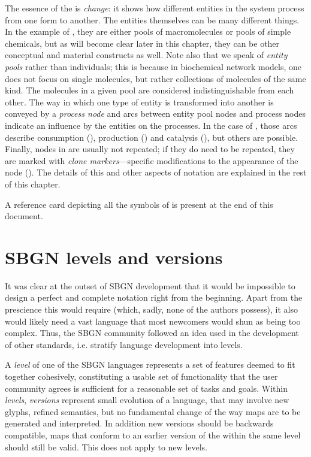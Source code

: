 The essence of the \PDs is \emph{change}: it shows how different entities in the system process from one form to another.  The entities themselves can be many different things.  In the example of , they are either pools of macromolecules or pools of simple chemicals, but as will become clear later in this chapter, they can be other conceptual and material constructs as well.  Note also that we speak of \emph{entity pools} rather than individuals; this is because in biochemical network models, one does not focus on single molecules, but rather collections of molecules of the same kind.  The molecules in a given pool are considered indistinguishable from each other.  The way in which one type of entity is transformed into another is conveyed by a \emph{process node} and arcs between entity pool nodes and process nodes indicate an influence by the entities on the processes.  In the case of , those arcs describe consumption (), production () and catalysis 
(), but others are possible.  Finally, nodes in \PDs are usually not repeated; if they do need to be repeated, they are marked with \emph{clone markers}---specific modifications to the appearance of the node (). The details of this and other aspects of \PD notation are explained in the rest of this chapter.

A reference card depicting all the symbols of \SBGNPDLone is present at the end of this document.

\section{SBGN levels and versions}
\label{sec:sbgn-levels}

It was clear at the outset of SBGN development that it would be impossible to design a perfect and complete notation right from the beginning.  Apart from the prescience this would require (which, sadly, none of the authors possess), it also would likely need a vast language that most newcomers would shun as being too complex.  Thus, the SBGN community followed an idea used in the development of other standards, i.e. stratify language development into levels.

A \emph{level} of one of the SBGN languages represents a set of features deemed to fit together cohesively, constituting a usable set of functionality that the user community agrees is sufficient for a reasonable set of tasks and goals.  Within \emph{levels}, \emph{versions} represent small evolution of a language, that may involve new glyphs, refined semantics, but no fundamental change of the way maps are to be generated and interpreted. In addition new versions should be backwards compatible, \ie \PD maps that conform to an earlier version of the \PDl within the same level should still be valid.  This does not apply to new levels. 

